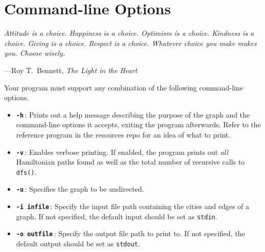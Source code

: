 \section{Command-line Options}

\textwidth
\epigraph{\emph{Attitude is a choice. Happiness is a choice. Optimism is
a choice. Kindness is a choice. Giving is a choice. Respect is a choice.
Whatever choice you make makes you. Choose wisely.}}{---Roy T.\ Bennett,
\emph{The Light in the Heart}}

\noindent
Your program must support any combination of the following command-line
options.

\begin{itemize}
  \item \textbf{\texttt{-h}}\,: Prints out a help message describing the purpose
    of the graph and the command-line options it accepts, exiting the
    program afterwards. Refer to the reference program in the resources
    repo for an idea of what to print.
  \item \textbf{\texttt{-v}}\,: Enables verbose printing. If enabled,
    the program prints out \emph{all} Hamiltonian paths found as well as
    the total number of recursive calls to \texttt{dfs()}.
  \item \textbf{\texttt{-u}}\,: Specifies the graph to be undirected.
  \item \textbf{\texttt{-i infile}}\,: Specify the input file path
    containing the cities and edges of a graph. If not specified, the
    default input should be set as \texttt{stdin}.
  \item \textbf{\texttt{-o outfile}}\,: Specify the output file path to
    print to. If not specified, the default output should be set as
    \texttt{stdout}.
\end{itemize}
